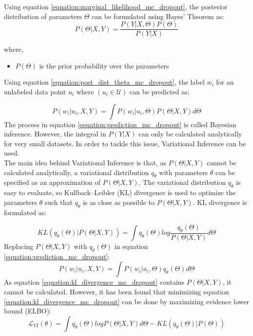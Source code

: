 Using equation \ref{equation:marginal_likelihood_mc_dropout}, the posterior distribution of parameters $\Theta$ can be formulated using Bayes' Theorem as:
\begin{equation}
    \label{equation:post_dist_theta_mc_dropout}
    P(\Theta | X, Y) = \frac{P(Y | X, \Theta) P (\Theta)}{P(Y | X)}
\end{equation}

where,
\begin{itemize}[label={}]
  \setlength\itemsep{0em}
  \item $P (\Theta)$ is the prior probability over the parameters
\end{itemize}
Using equation \ref{equation:post_dist_theta_mc_dropout}, the label $w_i$ for an unlabeled data point $u_i$ where $(u_i\in\mathcal{U})$ can be predicted as:

\begin{equation}
    \label{equation:prediction_mc_dropout}
    P(w_i | u_i, X, Y) = \int P(w_i|u_i, \Theta)P(\Theta|X, Y)d\Theta
\end{equation}
The process in equation \ref{equation:prediction_mc_dropout} is called Bayesian inference. However, the integral in $P(Y|X)$ can only be calculated analytically for very small datasets. In order to tackle this issue, Variational Inference can be used. \\
The main idea behind Variational Inference is that, as $P(\Theta | X, Y)$ cannot be calculated analytically, a variational distribution $q_\theta$ with parameters $\theta$ can be specified as an approximation of $P(\Theta | X, Y)$. The variational distribution $q_\theta$ is easy to evaluate, so Kullback–Leibler (KL) divergence\cite{kullback1951} is used to optimize the parameters $\theta$ such that $q_\theta$ is as close as possible to $P(\Theta | X, Y)$. KL divergence is formulated as:

\begin{equation}
    \label{equation:kl_divergence_mc_dropout}
    KL(q_\theta(\Theta)|P(\Theta| X, Y)) = \int{q_\theta(\Theta)log\frac{q_\theta(\Theta)}{P(\Theta| X, Y)}d\Theta}
\end{equation}
Replacing $P(\Theta| X, Y)$ with $q_\theta(\Theta)$ in equation \ref{equation:prediction_mc_dropout}:
\begin{equation}
    \label{equation:prediction_replaced_mc_dropout}
    P(w_i | u_i, X, Y) = \int P(w_i|u_i, \Theta)q_\theta(\Theta)d\Theta
\end{equation}
As equation \ref{equation:kl_divergence_mc_dropout} contains $P(\Theta| X, Y)$, it cannot be calculated. However, it has been found that minimizing equation \ref{equation:kl_divergence_mc_dropout} can be done by maximizing evidence lower bound (ELBO)\cite{bishop2006}:
\begin{equation}
    \label{equation:evidence_lower_bound_mc_dropout}
    \mathcal{L}_{VI}(\theta) = \int{q_\theta(\Theta)logP(\Theta| X, Y)d\Theta - KL(q_\theta(\Theta)|P(\Theta))}
\end{equation}

